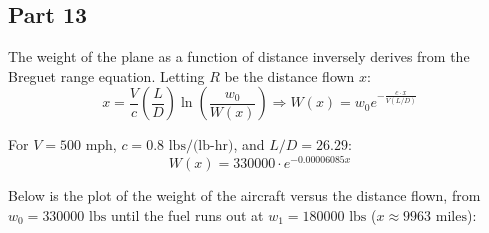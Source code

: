 \documentclass{KPS_assignment}
\begin{document}
\subsection*{Part 13}
The weight of the plane as a function of distance inversely derives from the Breguet range equation. Letting $R$ be the distance flown $x$:
$$ x = \frac{V}{c}\left(\frac{L}{D}\right) \ln\left( \frac{w_0}{W(x)} \right) \Rightarrow W(x) = w_0 e^{ \displaystyle - \frac{c \cdot x}{V (L/D)} } $$

For $V = 500 \text{ mph}$, $c = 0.8 \text{ lbs/(lb-hr)}$, and $L/D = 26.29$:
$$ W(x) = 330000 \cdot e^{-0.00006085 x} $$

Below is the plot of the weight of the aircraft versus the distance flown, from $w_0 = 330000 \text{ lbs}$ until the fuel runs out at $w_1 = 180000 \text{ lbs}$ ($x \approx 9963 \text{ miles}$):

\vspace{0.5cm}
\begin{center}
\end{center}
\end{document}
